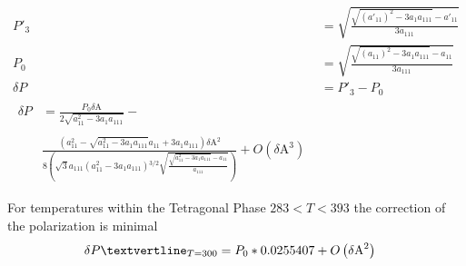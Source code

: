 \documentclass{article}
\begin{document}
\begin{align}
P'_3 &=\sqrt{\frac{\sqrt{(a'_{11})^2-3 a_1 a_{111}}-a'_{11}}{3a_{111}}} \\
P_0 &=\sqrt{\frac{\sqrt{(a_{11})^2-3 a_1 a_{111}}-a_{11}}{3a_{111}}} \\
\delta P &=P'_3-P_0 \\
\begin{split} \delta P &= \frac{P_0\text{$\delta $A}}{2 \sqrt{a_{11}^2-3 a_1 a_{111}}}- 
\\ \\ & \frac{\left(a_{11}^2-\sqrt{a_{11}^2-3 a_1 a_{111}} a_{11}+3 a_1 a_{111}\right) \text{$\delta $A}^2}{8 \left(\sqrt{3} a_{111} \left(a_{11}^2-3 a_1 a_{111}\right){}^{3/2} \sqrt{\frac{\sqrt{a_{11}^2-3 a_1 a_{111}}-a_{11}}{a_{111}}}\right)}+O\left(\text{$\delta $A}^3\right) \end{split}
\end{align}

For temperatures within the Tetragonal Phase $283 < T < 393 $ the correction of the polarization is minimal
\begin{align}
\delta P\text{\textvertline}_{T=300} &= P_0 *0.0255407+O\left(\text{$\delta $A}^2\right) 
\end{align}
\end{document}
